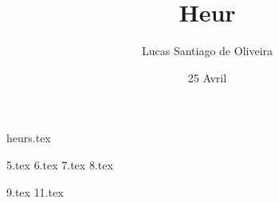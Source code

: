 \documentclass{article}
\author{Lucas Santiago de Oliveira}
\date{25 Avril}
\title{Heur}
\begin{document}
    \maketitle
    \tableofcontents

    \newpage
    {heurs.tex}

    {5.tex}
    {6.tex}
    {7.tex}
    {8.tex}

    {9.tex}
    {11.tex}
\end{document}
